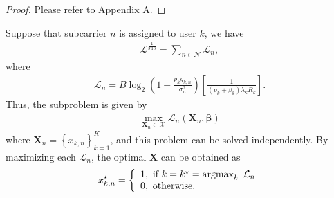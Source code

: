 \documentclass[journal]{IEEEtran}
\begin{document}
    \begin{proof}
        Please refer to Appendix A.
    \end{proof}
    Suppose that subcarrier $n$ is assigned to user $k$, we have
    \begin{equation}
        \begin{aligned}
            \mathcal{L}^{\frac{1}{\text{sub}}} = \sum_{n\in\mathcal{N}}\mathcal{L}_{n},
        \end{aligned}
    \end{equation}
    where
    \begin{equation}
        \begin{aligned}
            \mathcal{L}_{n} = B\log_2\left(1+\frac{p_{k}g_{k,n}}{\sigma_n^2}\right)\left[\frac{1}{(p_{k}+\beta_{k})\lambda_{k}R_{k}}\right].
        \end{aligned}
    \end{equation}
    Thus, the subproblem is given by
    \begin{equation}
        \begin{aligned}
            \max_{\boldsymbol{X}_{n}\in\mathcal{X}}\mathcal{L}_{n}(\boldsymbol{X}_{n},\boldsymbol\beta)
        \end{aligned}
    \end{equation}
    where $\boldsymbol X_{n}=\left\{x_{k, n}\right\}_{k=1}^{K}$, and this problem can be solved independently.
    By maximizing each $\mathcal{L}_{n}$, the optimal $\boldsymbol X$
    can be obtained as
    \begin{equation}{\label{op-x}}
        x_{k,n}^\star=\left\{\begin{array}{l}{1,~\text {if}~k=k^\star=\operatorname{argmax}_{k}~\mathcal{L}_{n}}
                                 \\ {0,
                                 ~\text{otherwise}.}
        \end{array}\right.
    \end{equation}
\end{document}
